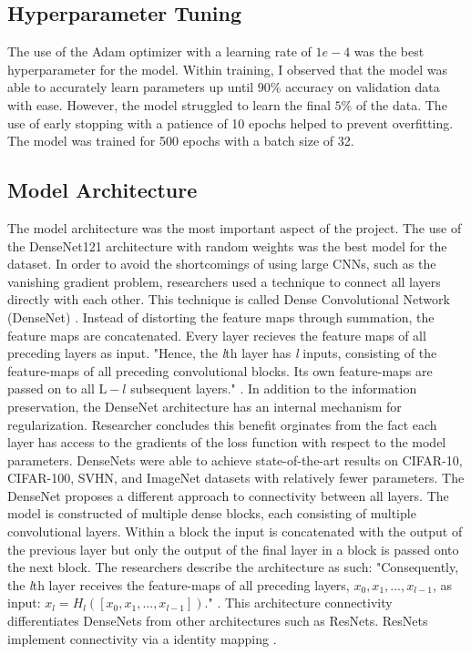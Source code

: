\documentclass[conference]{IEEEtran}
\begin{document}
\subsection{Hyperparameter Tuning}
The use of the Adam optimizer with a learning rate of $1e-4$ was the best hyperparameter for the model. Within training, I observed that the model was able to accurately learn parameters up until $90\%$ accuracy on validation data with ease. However, the model struggled to learn the final $5\%$ of the data. The use of early stopping with a patience of 10 epochs helped to prevent overfitting. The model was trained for 500 epochs with a batch size of 32.

\subsection{Model Architecture}
The model architecture was the most important aspect of the project. The use of the DenseNet121 architecture with random weights was the best model for the dataset. In order to avoid the shortcomings of using large CNNs, such as the vanishing gradient problem, researchers used a technique to connect all layers directly with each other. This technique is called Dense Convolutional Network (DenseNet) \cite{DBLP:journals/corr/HuangLW16a}. Instead of distorting the feature maps through summation, the feature maps are concatenated. Every layer recieves the feature maps of all preceding layers as input. "Hence, the \textit{l}th layer has \textit{l} inputs, consisting of the feature-maps of all preceding convolutional blocks. Its own feature-maps are passed on to all $\text{L}-l$ subsequent layers." \cite{DBLP:journals/corr/HuangLW16a}. In addition to the information preservation, the DenseNet architecture has an internal mechanism for regularization. Researcher concludes this benefit orginates from the fact each layer has access to the gradients of the loss function with respect to the model parameters. DenseNets were able to achieve state-of-the-art results on CIFAR-10, CIFAR-100, SVHN, and ImageNet datasets with relatively fewer parameters. The DenseNet proposes a different approach to connectivity between all layers. The model is constructed of multiple dense blocks, each consisting of multiple convolutional layers. Within a block the input is concatenated with the output of the previous layer but only the output of the final layer in a block is passed onto the next block. The researchers describe the architecture as such: "Consequently, the \textit{l}th layer receives the feature-maps of all preceding layers, $x_0, x_1, . . . , x_{l-1}$, as input: $x_l = H_l([x_0, x_1, . . . , x_{l-1}])$." \cite{DBLP:journals/corr/HuangLW16a}. This architecture connectivity differentiates DenseNets from other architectures such as ResNets. ResNets implement connectivity via a identity mapping \cite{DBLP:journals/corr/HeZRS15}.
\end{document}
